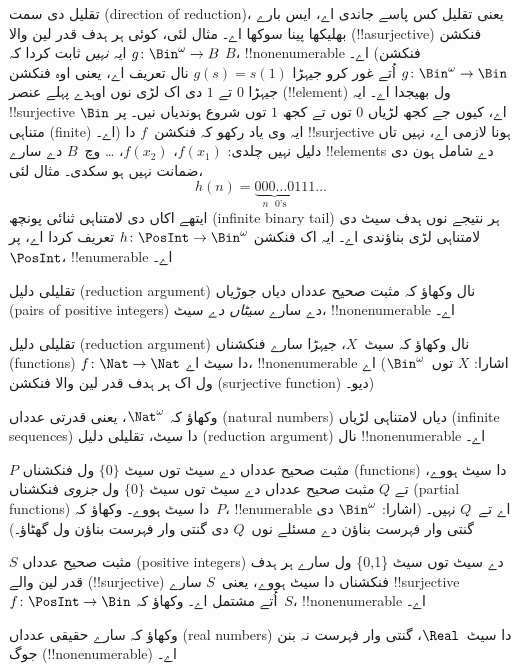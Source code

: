 \documentclass[../../../include/open-logic-section]{subfiles}
\begin{document}
\begin{explain}
تقلیل دی سمت (direction of reduction)، یعنی تقلیل کس پاسے جاندی اے،
ایس بارے بھلیکھا پینا سوکھا اے۔ مثال لئی، کوئی ہر ہدف قدر لین والا
(!!a{surjective}) فنکشن $g \colon \Bin^\omega \to B$ ایہ
\emph{نہیں} ثابت کردا کہ $B$، !!{nonenumerable} اے۔ (فنکشن
$g \colon \Bin^\omega \to \Bin$ اُتے غور کرو جیہڑا
$g(s) = s(1)$ نال تعریف اے، یعنی اوہ فنکشن جیہڑا $0$ تے $1$ دی
اک لڑی نوں اوہدے پہلے عنصر (!!{element}) ول بھیجدا اے۔ ایہ
!!{surjective}
اے، کیوں جے کجھ لڑیاں $0$ توں تے کجھ $1$ توں شروع ہوندیاں نیں۔ پر
$\Bin$ متناہی (finite) اے۔) ایہ وی یاد رکھو کہ فنکشن~$f$ دا
!!{surjective}
ہونا لازمی اے، نہیں تاں دلیل نہیں چلدی: $f(x_1)$، $f(x_2)$،
\dots{} وچ~$B$ دے سارے !!{element}s دے شامل ہون دی ضمانت نہیں
ہو سکدی۔ مثال لئی،
\[
h(n) = \underbrace{000\dots0}_{\text{$n$ $0$'s}}111\dots
\]
ایتھے اکاں دی لامتناہی ثنائی پونچھ (infinite binary tail) ہر نتیجے نوں
ہدف سیٹ دی لامتناہی لڑی بناؤندی اے۔ ایہ اک فنکشن $h\colon \PosInt \to
\Bin^\omega$ تعریف کردا اے، پر $\PosInt$، !!{enumerable} اے۔
\end{explain}

\begin{prob}
تقلیلی دلیل (reduction argument) نال وکھاؤ کہ مثبت صحیح عدداں دیاں
جوڑیاں (pairs of positive integers) دے سارے \emph{سیٹاں دے} سیٹ،
!!{nonenumerable} اے۔
\end{prob}

\begin{prob}\label{sfr:siz:red:prob:nat-nat}
  تقلیلی دلیل (reduction argument) نال وکھاؤ کہ سیٹ~$X$، جیہڑا سارے
  فنکشناں (functions)
  $f\colon \Nat \to \Nat$ دا سیٹ اے، !!{nonenumerable} اے (اشارا:
  $X$ توں~$\Bin^\omega$ ول
  اک ہر ہدف قدر لین والا فنکشن (surjective function) دیو۔)
\end{prob}

\begin{prob}
وکھاؤ کہ $\Nat^\omega$، یعنی قدرتی عدداں (natural numbers) دیاں
لامتناہی لڑیاں (infinite sequences) دا سیٹ، تقلیلی دلیل (reduction
argument) نال !!{nonenumerable} اے۔
\end{prob}

\begin{prob}
$P$ مثبت صحیح عدداں دے سیٹ توں سیٹ $\{0\}$ ول فنکشناں (functions) دا سیٹ ہووے،
تے $Q$ مثبت صحیح عدداں دے سیٹ توں سیٹ $\{0\}$ ول
\emph{جزوی} فنکشناں (partial functions) دا سیٹ ہووے۔ وکھاؤ کہ~$P$،
!!{enumerable} اے
تے~$Q$ نہیں۔ (اشارا: $\Bin^\omega$ دی گنتی وار فہرست بناؤن دے مسئلے
نوں~$Q$ دی گنتی وار فہرست بناؤن ول گھٹاؤ۔)
\end{prob}

\begin{prob}
$S$ مثبت صحیح عدداں (positive integers) دے سیٹ توں سیٹ \{0,1\} ول
سارے ہر ہدف قدر لین والے (!!{surjective}) فنکشناں دا سیٹ ہووے،
یعنی~$S$ سارے !!{surjective}
~$f\colon \PosInt \to \Bin$ اُتے مشتمل اے۔ وکھاؤ کہ~$S$،
!!{nonenumerable} اے۔
\end{prob}

\begin{prob}
وکھاؤ کہ سارے حقیقی عدداں (real numbers) دا سیٹ~$\Real$،
گنتی وار فہرست نہ بنن جوگ (!!{nonenumerable}) اے۔
\end{prob}
\end{document}
